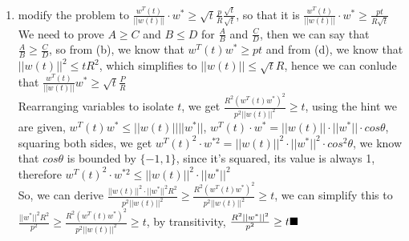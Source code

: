\documentclass{article}
\begin{document}
\begin{enumerate}
\begin{enumerate}[label=(\alph*)]
            \item modify the problem to $\frac{w^T(t)}{||w(t)||} \cdot w^* \geq \sqrt{t} \frac{p}{R} \frac{\sqrt{t}}{\sqrt{t}}$, so that it is $\frac{w^T(t)}{||w(t)||} \cdot w^* \geq \frac{pt}{R\sqrt{t}}$ \\[0.25in]
            We need to prove $A \geq C$ and $B \leq D$ for $\frac{A}{B}$ and $\frac{C}{D}$, then we can say that $\frac{A}{B} \geq \frac{C}{D}$, so from (b), we know that $w^T(t)w^* \geq pt$ and from (d), we know that $||w(t)||^2 \leq tR^2$, which simplifies to $||w(t)|| \leq \sqrt{t}R$, hence we can conlude that $\frac{w^T(t)}{||w(t)||}w^* \geq \sqrt{t} \frac{P}{R}$\\[0.25in]
            Rearranging variables to isolate $t$, we get $\frac{R^2(w^T(t)w^*)^2}{p^2||w(t)||^2} \geq t$, using the hint we are given, $w^T(t)w^* \leq ||w(t)|| ||w^*||$, $w^T(t) \cdot w^* = ||w(t)|| \cdot ||w^*|| \cdot cos \theta$, squaring both sides, we get $w^T(t)^2 \cdot w^{*2} = ||w(t)||^2 \cdot ||w^*||^2 \cdot cos^2\theta$, we know that $cos\theta$ is bounded by $\{-1, 1\}$, since it's squared, its value is always 1, therefore $w^T(t)^2 \cdot w^{*2} \leq ||w(t)||^2 \cdot ||w^*||^2$\\[0.25in]
            So, we can derive $\frac{||w(t)||^2 \cdot ||w^*||^2 R^2}{p^2 ||w(t)||^2} \geq \frac{R^2(w^T(t)w^*)^2}{p^2||w(t)||^2} \geq t$, we can simplify this to $\frac{||w^*||^2R^2}{p^2} \geq \frac{R^2(w^T(t)w^*)^2}{p^2||w(t)||^2}\geq t$, by transitivity, $\frac{R^2||w^*||^2}{p^2}\geq t \hfill \blacksquare$
        \end{enumerate}


\end{enumerate}
\end{document}
